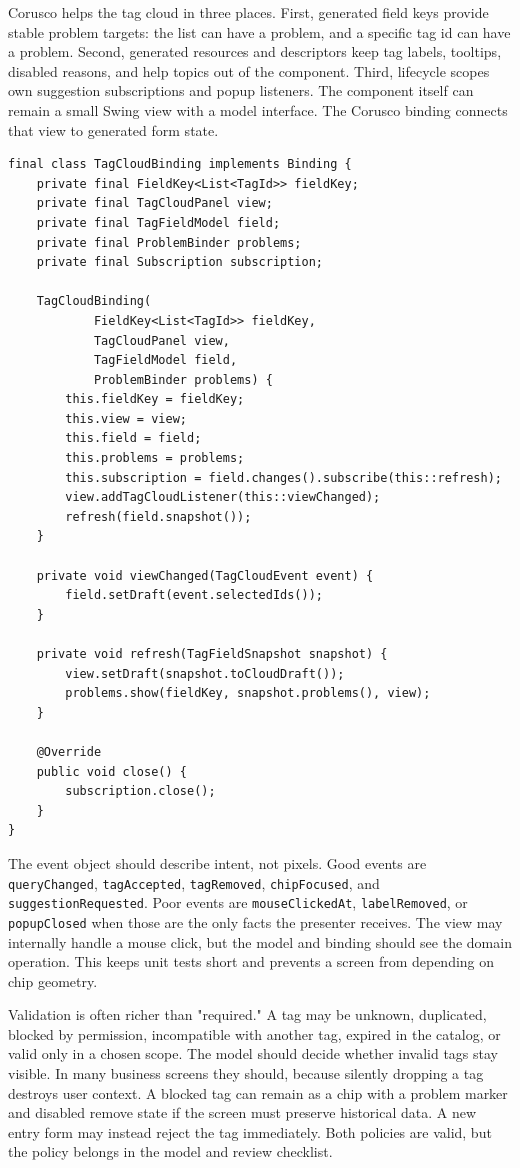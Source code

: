 Corusco helps the tag cloud in three places. First, generated field keys provide
stable problem targets: the list can have a problem, and a specific tag id can
have a problem. Second, generated resources and descriptors keep tag labels,
tooltips, disabled reasons, and help topics out of the component. Third,
lifecycle scopes own suggestion subscriptions and popup listeners. The component
itself can remain a small Swing view with a model interface. The Corusco binding
connects that view to generated form state.

\begin{lstlisting}[caption={A Corusco binding maps tag model problems to the cloud view.}]
final class TagCloudBinding implements Binding {
    private final FieldKey<List<TagId>> fieldKey;
    private final TagCloudPanel view;
    private final TagFieldModel field;
    private final ProblemBinder problems;
    private final Subscription subscription;

    TagCloudBinding(
            FieldKey<List<TagId>> fieldKey,
            TagCloudPanel view,
            TagFieldModel field,
            ProblemBinder problems) {
        this.fieldKey = fieldKey;
        this.view = view;
        this.field = field;
        this.problems = problems;
        this.subscription = field.changes().subscribe(this::refresh);
        view.addTagCloudListener(this::viewChanged);
        refresh(field.snapshot());
    }

    private void viewChanged(TagCloudEvent event) {
        field.setDraft(event.selectedIds());
    }

    private void refresh(TagFieldSnapshot snapshot) {
        view.setDraft(snapshot.toCloudDraft());
        problems.show(fieldKey, snapshot.problems(), view);
    }

    @Override
    public void close() {
        subscription.close();
    }
}
\end{lstlisting}

The event object should describe intent, not pixels. Good events are
\texttt{queryChanged}, \texttt{tagAccepted}, \texttt{tagRemoved},
\texttt{chipFocused}, and \texttt{suggestionRequested}. Poor events are
\texttt{mouseClickedAt}, \texttt{labelRemoved}, or \texttt{popupClosed}
when those are the only facts the presenter receives. The view may internally
handle a mouse click, but the model and binding should see the domain operation.
This keeps unit tests short and prevents a screen from depending on chip
geometry.

Validation is often richer than "required." A tag may be unknown, duplicated,
blocked by permission, incompatible with another tag, expired in the catalog, or
valid only in a chosen scope. The model should decide whether invalid tags stay
visible. In many business screens they should, because silently dropping a tag
destroys user context. A blocked tag can remain as a chip with a problem marker
and disabled remove state if the screen must preserve historical data. A new
entry form may instead reject the tag immediately. Both policies are valid, but
the policy belongs in the model and review checklist.

